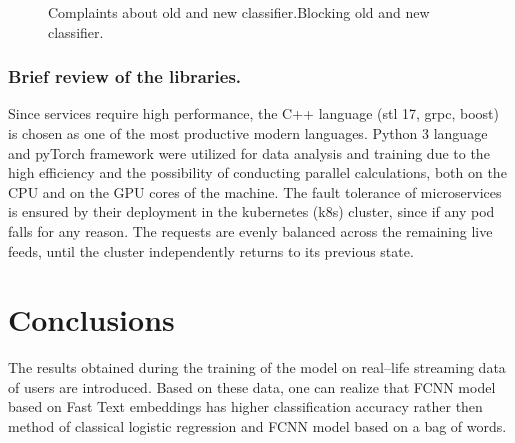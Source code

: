 \documentclass[12pt]{jpconf}
\begin{document}
\begin{figure}
\centering


\caption{\label{fig:06} Complaints about old and new classifier.Blocking old and new classifier.}
\end{figure}

\subsubsection*{Brief review of the libraries.}
Since services require high performance, the C++ language (stl 17, grpc, boost) is chosen as one of the most productive modern languages. Python 3 language and pyTorch framework were utilized for data analysis and training due to the high efficiency and the possibility of conducting parallel calculations, both on the CPU and on the GPU cores of the machine.
The fault tolerance of microservices is ensured by their deployment in the kubernetes (k8s) cluster, since if any pod falls for any reason. The requests are evenly balanced across the remaining live feeds, until the cluster independently returns to its previous state.

\section{Conclusions}

The results obtained during the training of the model on real--life streaming data of users are introduced. Based on these data, one can realize that FCNN model based on Fast Text embeddings has higher classification accuracy rather then method of classical logistic regression and FCNN  model based on a bag of words.
\end{document}
